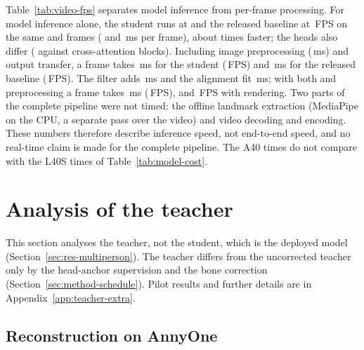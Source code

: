 Table~\ref{tab:video-fps} separates model inference from per-frame processing. For model inference alone, the
student runs at \VideoStudentRawFPS{} and the released baseline at \VideoNAVERFPS\,FPS on the same \VideoGPU{} and
frames (\VideoStudentMs{} and \VideoNAVERMs\,ms per frame), about \VideoSpeedRatioNAVER{} times faster; the heads
also differ (\BgNaverHeadLayers{} against \BgOurHeadLayers{} cross-attention blocks).
Including image preprocessing (\VideoPreMs\,ms) and output transfer, a frame takes \VideoStudentPipeMs\,ms for the student
(\VideoStudentPipeFPS\,FPS) and \VideoNAVERPipeMs\,ms for the released baseline (\VideoNAVERPipeFPS\,FPS). The filter
adds \VideoTemporalMs\,ms and the alignment fit \VideoAlignMs\,ms; with both and preprocessing a frame takes
\VideoAlignedPipeMs\,ms (\VideoAlignedPipeFPS\,FPS), and \VideoAlignedRenderFPS\,FPS with rendering. Two parts of
the complete pipeline were not timed: the offline landmark extraction (MediaPipe on the CPU, a separate pass over
the video) and video decoding and encoding. These numbers therefore describe inference speed, not end-to-end speed,
and no real-time claim is made for the complete pipeline. The A40 times do not compare with the L40S times of
Table~\ref{tab:model-cost}.


\section{Analysis of the teacher}
\label{sec:res-teacher-ablations}

This section analyses the teacher, not the student, which is the deployed model (Section~\ref{sec:res-multiperson}). The teacher differs from the uncorrected teacher only by the head-anchor supervision and
the bone correction (Section~\ref{sec:method-schedule}). Pilot results and further details are in
Appendix~\ref{app:teacher-extra}.

\subsection{Reconstruction on AnnyOne}
\label{sec:res-final}



